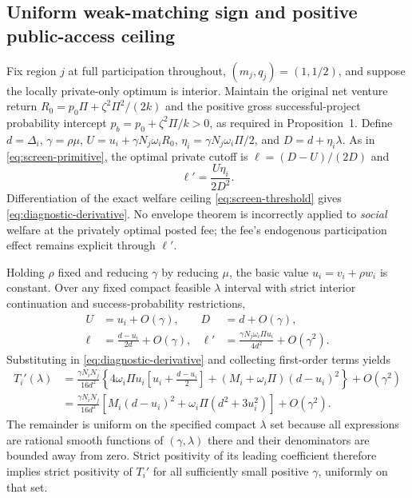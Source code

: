 \subsection{Uniform weak-matching sign and positive public-access ceiling}
Fix region $j$ at full participation throughout, $(m_j,q_j)=(1,1/2)$, and suppose the locally private-only optimum is interior. Maintain the original net venture return $R_0=p_0\Pi+\zeta^2\Pi^2/(2k)$ and the positive gross successful-project probability intercept $p_b=p_0+\zeta^2\Pi/k>0$, as required in Proposition~1. Define $d=\Delta_i$, $\gamma=\rho\mu$, $U=u_i+\gamma N_j\omega_iR_0$, $\eta_i=\gamma N_j\omega_i\Pi/2$, and $D=d+\eta_i\lambda$. As in \eqref{eq:screen-primitive}, the optimal private cutoff is $\ell=(D-U)/(2D)$ and
\[
 \ell'=\frac{U\eta_i}{2D^2}.
\]
Differentiation of the exact welfare ceiling \eqref{eq:screen-threshold} gives \eqref{eq:diagnostic-derivative}. No envelope theorem is incorrectly applied to \emph{social} welfare at the privately optimal posted fee; the fee's endogenous participation effect remains explicit through $\ell'$.

Holding $\rho$ fixed and reducing $\gamma$ by reducing $\mu$, the basic value $u_i=v_i+\rho w_i$ is constant. Over any fixed compact feasible $\lambda$ interval with strict interior continuation and success-probability restrictions,
\[
 \begin{aligned}
 U&=u_i+O(\gamma),&
 D&=d+O(\gamma),\\
 \ell&=\frac{d-u_i}{2d}+O(\gamma),&
 \ell'&=\frac{\gamma N_j\omega_i\Pi u_i}{4d^2}
       +O(\gamma^2).
 \end{aligned}
\]
Substituting in \eqref{eq:diagnostic-derivative} and collecting first-order terms yields
\[
 \begin{split}
 T_i'(\lambda)
  &=\frac{\gamma N_iN_j}{16d^2}
     \left\{
       4\omega_i\Pi u_i
          \left[u_i+\frac{d-u_i}{2}\right]
       +(M_i+\omega_i\Pi)(d-u_i)^2
     \right\}+O(\gamma^2)\\
  &=\frac{\gamma N_iN_j}{16d^2}
       \left[M_i(d-u_i)^2+
         \omega_i\Pi(d^2+3u_i^2)\right]
         +O(\gamma^2).
 \end{split}
\]
The remainder is uniform on the specified compact $\lambda$ set because all expressions are rational smooth functions of $(\gamma,\lambda)$ there and their denominators are bounded away from zero. Strict positivity of its leading coefficient therefore implies strict positivity of $T_i'$ for all sufficiently small positive $\gamma$, uniformly on that set.

